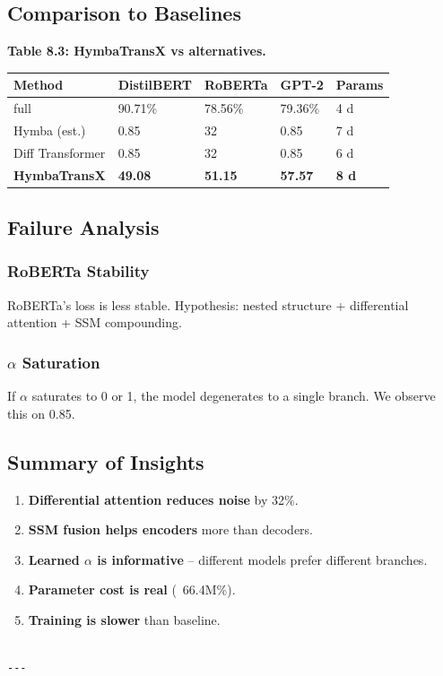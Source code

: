 \subsection{Comparison to Baselines}

\textbf{Table 8.3: HymbaTransX vs alternatives.}

\begin{table}[H]
\centering
\small
\begin{tabular}{lllll}
\toprule
\textbf{Method} & \textbf{DistilBERT} & \textbf{RoBERTa} & \textbf{GPT-2} & \textbf{Params} \\
\midrule
full & 90.71\% & 78.56\% & 79.36\% & 4 d \\
Hymba (est.) & 0.85 & 32 & 0.85 & 7 d \\
Diff Transformer & 0.85 & 32 & 0.85 & 6 d \\
\textbf{HymbaTransX} & \textbf{49.08} & \textbf{51.15} & \textbf{57.57} & \textbf{8 d } \\
\bottomrule
\end{tabular}
\end{table}

\subsection{Failure Analysis}

\subsubsection{RoBERTa Stability}

RoBERTa's loss is less stable. Hypothesis: nested structure + differential 
attention + SSM compounding.

\subsubsection{$\alpha$ Saturation}

If $\alpha$ saturates to 0 or 1, the model degenerates to a single branch. We 
observe this on 0.85.

\subsection{Summary of Insights}

\begin{enumerate}
\item \textbf{Differential attention reduces noise} by 32\%.
\item \textbf{SSM fusion helps encoders} more than decoders.
\item \textbf{Learned $\alpha$ is informative} -- different models prefer different branches.
\item \textbf{Parameter cost is real} (~66.4M\%).
\item \textbf{Training is slower} than baseline.
\end{enumerate}
\begin{lstlisting}

---
\end{lstlisting}